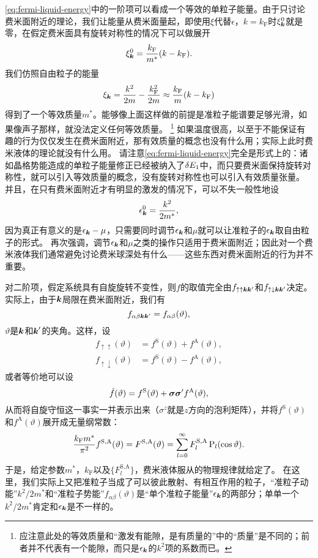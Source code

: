 \eqref{eq:fermi-liquid-energy}中的一阶项可以看成一个等效的单粒子能量。由于只讨论费米面附近的理论，我们让能量从费米面量起，即使用$\xi$代替$\epsilon$，$k=k_\text{F}$时$\xi^0_{\vb*{k}}$就是零，在假定费米面具有旋转对称性的情况下可以做展开
\[
    \xi^0_{\vb*{k}} = \frac{k_\text{F}}{m^*} (k - k_\text{F}).
\]
我们仿照自由粒子的能量
\[
    \xi_{\vb*{k}} = \frac{k^2}{2m} - \frac{k_\text{F}^2}{2m} \approx \frac{k_\text{F}}{m} (k - k_\text{F})
\]
得到了一个等效质量$m^*$。能够像上面这样做的前提是准粒子能谱要足够光滑，如果像声子那样，就没法定义任何等效质量。%
\footnote{应注意此处的等效质量和“激发有能隙，是有质量的”中的“质量”是不同的；前者并不代表有一个能隙，而只是$\epsilon_{\vb*{k}}$的$k^2$项的系数而已。}%
如果温度很高，以至于不能保证有趣的行为仅仅发生在费米面附近，那有效质量的概念也没有什么用；实际上此时费米液体的理论就没有什么用。
请注意\eqref{eq:fermi-liquid-energy}完全是形式上的：诸如晶格势能造成的单粒子能量修正已经被纳入了$\var{E_1}$中，而只要费米面保持旋转对称性，就可以引入等效质量的概念，没有旋转对称性也可以引入有效质量张量。
并且，在只有费米面附近才有明显的激发的情况下，可以不失一般性地设
\[
    \epsilon_{\vb*{k}}^0 = \frac{k^2}{2m^*},
\]
因为真正有意义的是$\epsilon_{\vb*{k}} - \mu$，只需要同时调节$\epsilon_{\vb*{k}}$和$\mu$就可以让准粒子的$\epsilon_{\vb*{k}}$取自由粒子的形式。
再次强调，调节$\epsilon_{\vb*{k}}$和$\mu$之类的操作只适用于费米面附近；因此对一个费米液体我们通常避免讨论费米球深处有什么——这些东西对费米面附近的行为并不重要。

对二阶项，假定系统具有自旋旋转不变性，则$f$的取值完全由$f_{\uparrow \uparrow \vb*{k} \vb*{k}'}$和$f_{\uparrow \downarrow \vb*{k} \vb*{k}'}$决定。
实际上，由于$\vb*{k}$局限在费米面附近，我们有
\[
    f_{\alpha \beta \vb*{k} \vb*{k}'} = f_{\alpha \beta}(\vartheta),
\]
$\vartheta$是$\vb*{k}$和$\vb*{k}'$的夹角。这样，设
\begin{equation}
    \begin{aligned}
        f_{\uparrow \uparrow}(\vartheta) &= f^\text{S}(\vartheta) + f^\text{A}(\vartheta), \\
        f_{\uparrow \downarrow}(\vartheta) &= f^\text{S}(\vartheta) - f^\text{A}(\vartheta),
    \end{aligned}
\end{equation}
或者等价地可以设
\begin{equation}
    \hat{f}(\vartheta) = f^\text{S}(\vartheta) + \vb*{\sigma} \vb*{\sigma}' f^\text{A}(\vartheta),
    \label{eq:fermi-liquid-f-sym-decomposition}
\end{equation}
从而将自旋守恒这一事实一并表示出来（${\sigma}^z$就是$z$方向的泡利矩阵），并将$f^\text{S}(\vartheta)$和$f^\text{A}(\vartheta)$展开成无量纲常数：
\begin{equation}
    \frac{k_\text{F} m^*}{\pi^2} f^\text{S,A}(\vartheta) = F^{\text{S,A}}(\vartheta) = \sum_{l=0}^\infty F_l^\text{S,A} \operatorname{P}_l (\cos \vartheta).
    \label{eq:fermi-liquid-f-l}
\end{equation}
于是，给定参数$m^*$，$k_\text{F}$以及$\{F_l^\text{S,A}\}$，费米液体服从的物理规律就给定了。
在这里，我们实际上又把准粒子当成了可以彼此散射、有相互作用的粒子，“准粒子动能”$k^2/2m^*$和“准粒子势能”$f_{\alpha \beta}(\vartheta)$是“单个准粒子能量”$\epsilon_{\vb*{k}}$的两部分；单单一个$k^2/2m^*$肯定和$\epsilon_{\vb*{k}}$是不一样的。

